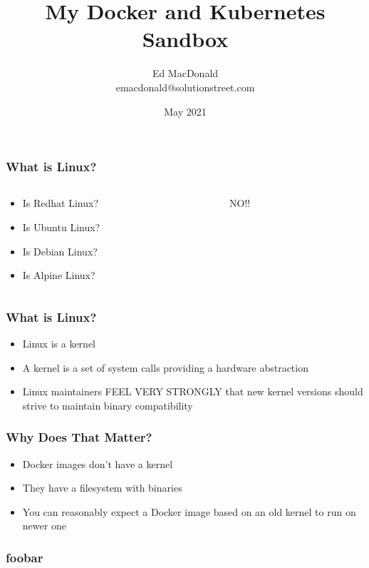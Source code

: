 \documentclass{beamer}
\title[Kubernetes]{My Docker and Kubernetes Sandbox}
\author[Ed MacDonald]{Ed MacDonald\\emacdonald@solutionstreet.com}
\date{May 2021}
\begin{document}
    \frame{\titlepage}

    \begin{frame}
    \frametitle{What is Linux?}
    \begin{columns}
        \begin{column}{0.5\textwidth}
            \begin{itemize}
                \item Is Redhat Linux?\pause
                \item Is Ubuntu Linux?\pause
                \item Is Debian Linux?\pause
                \item Is Alpine Linux?\pause
            \end{itemize}
        \end{column}
        \begin{column}{0.5\textwidth}
            NO!!
        \end{column}
    \end{columns}
    \end{frame}

    \begin{frame}
    \frametitle{What is Linux?}
    \begin{itemize}
        \item Linux is a kernel\pause
        \item A kernel is a set of system calls providing a hardware abstraction\pause
        \item Linux maintainers FEEL VERY STRONGLY that new kernel versions should strive to maintain binary compatibility
    \end{itemize}
    \end{frame}

    \begin{frame}
      \frametitle{Why Does That Matter?}
      \begin{itemize}
      \item Docker images don't have a kernel\pause
      \item They have a filesystem with binaries\pause
      \item You can reasonably expect a Docker image based on an old kernel to run on newer one
      \end{itemize}
    \end{frame}

    \begin{frame}
     \frametitle{foobar}
    \end{frame}
\end{document}
